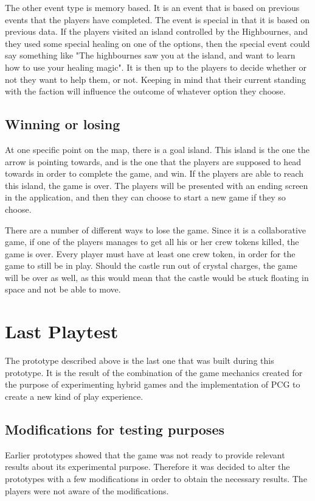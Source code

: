 The other event type is memory based. It is an event that is based on previous events that the players have completed. The event is special in that it is based on previous data. If the players visited an island controlled by the Highbournes, and they used some special healing on one of the options, then the special event could say something like "The highbournes saw you at the island, and want to learn how to use your healing magic". It is then up to the players to decide whether or not they want to help them, or not. Keeping in mind that their current standing with the faction will influence the outcome of whatever option they choose. 

\subsection{Winning or losing}
At one specific point on the map, there is a goal island. This island is the one the arrow is pointing towards, and is the one that the players are supposed to head towards in order to complete the game, and win.
If the players are able to reach this island, the game is over. The players will be presented with an ending screen in the application, and then they can choose to start a new game if they so choose. 

There are a number of different ways to lose the game. Since it is a collaborative game, if one of the players manages to get all his or her crew tokens killed, the game is over. Every player must have at least one crew token, in order for the game to still be in play.
Should the castle run out of crystal charges, the game will be over as well, as this would mean that the castle would be stuck floating in space and not be able to move.

\section{Last Playtest}
The prototype described above is the last one that was built during this prototype. It is the result of the combination of the game mechanics created for the purpose of experimenting hybrid games and the implementation of PCG to create a new kind of play experience.
\subsection{Modifications for testing purposes}
Earlier prototypes showed that the game was not ready to provide relevant results about its experimental purpose. Therefore it was decided to alter the prototypes with a few modifications in order to obtain the necessary results. The players were not aware of the modifications.

